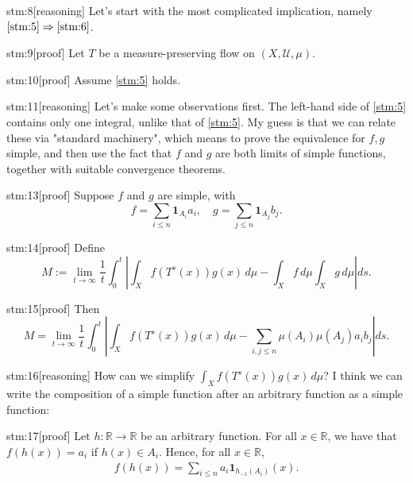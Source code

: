 \begin{stm}{stm:8}[reasoning]
Let's start with the most complicated implication, namely $\ref{stm:5} \Rightarrow \ref{stm:6}$.
\end{stm}

\begin{stm}{stm:9}[proof]
Let $T$ be a measure-preserving flow on $(X, \mathcal{U}, \mu)$.
\end{stm}

\begin{stm}{stm:10}[proof]
Assume \ref{stm:5} holds.
\end{stm}

\begin{stm}{stm:11}[reasoning]
Let's make some observations first. The left-hand side of \ref{stm:5} contains only one integral, unlike that of \ref{stm:5}. My guess is that we can relate these via "standard machinery", which means to prove the equivalence for $f, g$ simple, and then use the fact that $f$ and $g$ are both limits of simple functions, together with suitable convergence theorems.
\end{stm}

\begin{stm}{stm:13}[proof]
Suppose $f$ and $g$ are simple, with 
\[
f = \sum_{i \leq n} \mathbf{1}_{A_i} a_i, \quad g = \sum_{j \leq n} \mathbf{1}_{A_j} b_j.
\]
\end{stm}

\begin{stm}{stm:14}[proof]
Define
\[
M:= \lim_{t \to \infty} \frac{1}{t} \int_0^t \left| \int_X f(T^s(x))g(x) \, d\mu - \int_X f \, d\mu \int_X g \, d\mu \right| ds.
\]
\end{stm}

\begin{stm}{stm:15}[proof]
Then
\[
M= \lim_{t \to \infty} \frac{1}{t} \int_0^t \left| \int_X f(T^s(x))g(x) \, d\mu - \sum_{i,j \leq n} \mu(A_i) \mu(A_j) a_i b_j \right| ds.
\]
\end{stm}

\begin{stm}{stm:16}[reasoning]
How can we simplify $\int_X f(T^s(x)) g(x) \, d\mu$? I think we can write the composition of a simple function after an arbitrary function as a simple function:
\end{stm}

\begin{stm}{stm:17}[proof]
Let $h: \mathbb{R} \to \mathbb{R}$ be an arbitrary function. For all $x \in \mathbb{R}$, we have that $f(h(x)) = a_i$ if $h(x) \in A_i$. Hence, for all $x \in \mathbb{R}$,
\begin{align*}
f(h(x)) = \sum_{i \leq n} a_i \mathbf{1}_{h_{-1}(A_i)}(x).
\end{align*}

\end{stm}

